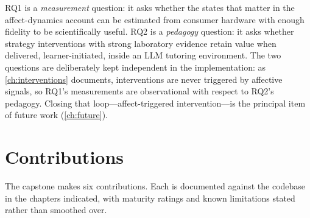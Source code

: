 RQ1 is a \emph{measurement} question: it asks whether the states that
matter in the affect-dynamics account can be estimated from consumer
hardware with enough fidelity to be scientifically useful. RQ2 is a
\emph{pedagogy} question: it asks whether strategy interventions with
strong laboratory evidence \citep{dunlosky2013} retain value when
delivered, learner-initiated, inside an LLM tutoring environment. The two
questions are deliberately kept independent in the implementation: as
\cref{ch:interventions} documents, interventions are never triggered by
affective signals, so RQ1's measurements are observational with respect to
RQ2's pedagogy. Closing that loop---affect-triggered intervention---is the
principal item of future work (\cref{ch:future}).

\section{Contributions}
\label{sec:intro-contributions}

The capstone makes six contributions. Each is documented against the
codebase in the chapters indicated, with maturity ratings and known
limitations stated rather than smoothed over.

